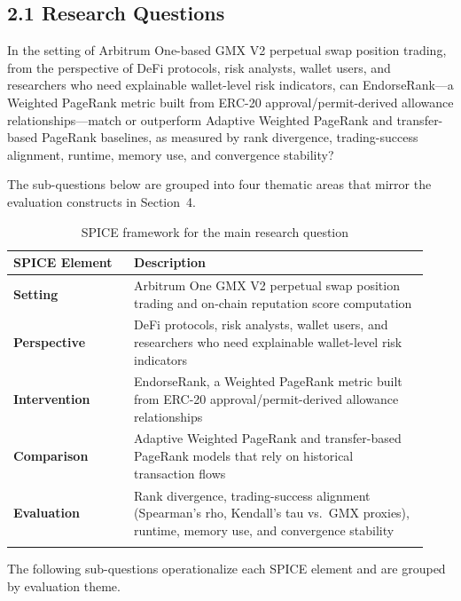 \subsection*{2.1 Research Questions}
\label{sec:research-questions}

In the setting of Arbitrum One-based GMX V2 perpetual swap position trading, from the perspective of DeFi protocols, risk analysts, wallet users, and researchers who need explainable wallet-level risk indicators, can EndorseRank---a Weighted PageRank metric built from ERC-20 approval/permit-derived allowance relationships---match or outperform Adaptive Weighted PageRank and transfer-based PageRank baselines, as measured by rank divergence, trading-success alignment, runtime, memory use, and convergence stability?


The sub-questions below are grouped into four thematic areas that mirror the evaluation constructs in Section~4.


\begin{longtable}{>{\raggedright\arraybackslash}p{0.27\linewidth}>{\raggedright\arraybackslash}p{0.66\linewidth}}
\caption{SPICE framework for the main research question}\\
\toprule
\textbf{SPICE Element} & Description \\
\midrule
\textbf{Setting} & Arbitrum One GMX V2 perpetual swap position trading and on-chain reputation score computation \\
\addlinespace
\textbf{Perspective} & DeFi protocols, risk analysts, wallet users, and researchers who need explainable wallet-level risk indicators \\
\addlinespace
\textbf{Intervention} & EndorseRank, a Weighted PageRank metric built from ERC-20 approval/permit-derived allowance relationships \\
\addlinespace
\textbf{Comparison} & Adaptive Weighted PageRank and transfer-based PageRank models that rely on historical transaction flows \\
\addlinespace
\textbf{Evaluation} & Rank divergence, trading-success alignment (Spearman's rho, Kendall's tau vs.\ GMX proxies), runtime, memory use, and convergence stability \\
\addlinespace
\bottomrule
\end{longtable}

The following sub-questions operationalize each SPICE element and are grouped by evaluation theme.

